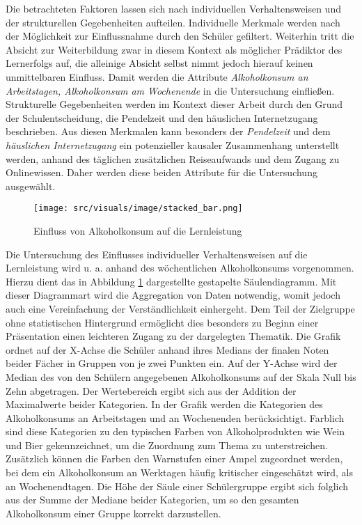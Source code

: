 Die betrachteten Faktoren lassen sich nach individuellen Verhaltensweisen und der strukturellen Gegebenheiten aufteilen.
Individuelle Merkmale werden nach der Möglichkeit zur Einflussnahme durch den Schüler gefiltert.
Weiterhin tritt die Absicht zur Weiterbildung zwar in diesem Kontext als möglicher Prädiktor des Lernerfolgs auf, die alleinige Absicht selbst nimmt jedoch hierauf keinen unmittelbaren Einfluss.
Damit werden die Attribute \textit{Alkoholkonsum an Arbeitstagen, Alkoholkonsum am Wochenende} in die Untersuchung einfließen.
Strukturelle Gegebenheiten werden im Kontext dieser Arbeit durch den Grund der Schulentscheidung, die Pendelzeit und den häuslichen Internetzugang beschrieben.
Aus diesen Merkmalen kann besonders der \textit{Pendelzeit} und dem \textit{häuslichen Internetzugang} ein potenzieller kausaler Zusammenhang unterstellt werden, anhand des täglichen zusätzlichen Reiseaufwands und dem Zugang zu Onlinewissen.
Daher werden diese beiden Attribute für die Untersuchung ausgewählt.

\clearpage
\begin{figure}[htb]
    \centering
    \texttt{[image: src/visuals/image/stacked\_bar.png]}
    \caption{Einfluss von Alkoholkonsum auf die Lernleistung}
    \label{fig:stacked_bar}
\end{figure}

Die Untersuchung des Einflusses individueller Verhaltensweisen auf die Lernleistung wird u. a. anhand des wöchentlichen Alkoholkonsums vorgenommen.
Hierzu dient das in Abbildung \ref{fig:stacked_bar} dargestellte gestapelte Säulendiagramm.
Mit dieser Diagrammart wird die Aggregation von Daten notwendig, womit jedoch auch eine Vereinfachung der Verständlichkeit einhergeht.
Dem Teil der Zielgruppe ohne statistischen Hintergrund ermöglicht dies besonders zu Beginn einer Präsentation einen leichteren Zugang zu der dargelegten Thematik.
Die Grafik ordnet auf der X-Achse die Schüler anhand ihres Medians der finalen Noten beider Fächer in Gruppen von je zwei Punkten ein.
Auf der Y-Achse wird der Median des von den Schülern angegebenen Alkoholkonsums auf der Skala Null bis Zehn abgetragen.
Der Wertebereich ergibt sich aus der Addition der Maximalwerte beider Kategorien.
In der Grafik werden die Kategorien des Alkoholkonsums an Arbeitstagen und an Wochenenden berücksichtigt.
Farblich sind diese Kategorien zu den typischen Farben von Alkoholprodukten wie Wein und Bier gekennzeichnet, um die Zuordnung zum Thema zu unterstreichen.
Zusätzlich können die Farben den Warnstufen einer Ampel zugeordnet werden, bei dem ein Alkoholkonsum an Werktagen häufig kritischer eingeschätzt wird, als an Wochenendtagen.
Die Höhe der Säule einer Schülergruppe ergibt sich folglich aus der Summe der Mediane beider Kategorien, um so den gesamten Alkoholkonsum einer Gruppe korrekt darzustellen.

